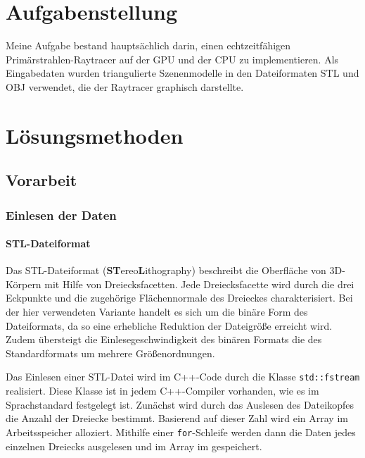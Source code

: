\documentclass[crop=false]{standalone}
\begin{document}
  \section{Aufgabenstellung} %
  \label{sec:aufgabenstellung}
    Meine Aufgabe bestand hauptsächlich darin, einen echtzeitfähigen Primärstrahlen-Raytracer auf der GPU und der CPU zu implementieren.
    Als Eingabedaten wurden triangulierte Szenenmodelle in den Dateiformaten STL und OBJ verwendet, die der Raytracer graphisch darstellte.

  \section{Lösungsmethoden} %
  \label{sec:loesungsmethoden}
    \subsection{Vorarbeit} %
    \label{sub:vorarbeit}

      \subsubsection{Einlesen der Daten} %
      \label{ssub:einlesen_der_daten}
        \paragraph{STL-Dateiformat}
        Das STL-Dateiformat (\textbf{ST}ereo\textbf{L}ithography) beschreibt die Oberfläche von 3D-Körpern mit Hilfe von Dreiecksfacetten.
        Jede Dreiecksfacette wird durch die drei Eckpunkte und die zugehörige Flächennormale des Dreieckes charakterisiert.
        Bei der hier verwendeten Variante handelt es sich um die binäre Form des Dateiformats, da so eine erhebliche Reduktion der Dateigröße erreicht wird.
        Zudem übersteigt die Einlesegeschwindigkeit des binären Formats die des Standardformats um mehrere Größenordnungen.

        Das Einlesen einer STL-Datei wird im C++-Code durch die Klasse \texttt{std::fstream} realisiert.
        Diese Klasse ist in jedem C++-Compiler vorhanden, wie es im Sprachstandard festgelegt ist.
        Zunächst wird durch das Auslesen des Dateikopfes die Anzahl der Dreiecke bestimmt.
        Basierend auf dieser Zahl wird ein Array im Arbeitsspeicher alloziert.
        Mithilfe einer \texttt{for}-Schleife werden dann die Daten jedes einzelnen Dreiecks ausgelesen und im Array im gespeichert.
\end{document}

